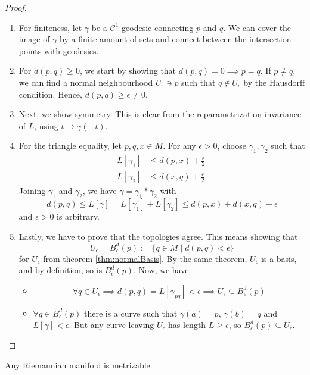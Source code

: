 \begin{proof}
    \begin{enumerate}
        \item For finiteness, let $\gamma$ be a $\mathcal{C}^1$ geodesic connecting $p$ and $q$. We can cover the image of $\gamma$ by a finite amount of sets and connect between the intersection points with geodesics. 
        \item For $d(p,q) \geq 0$, we start by showing that $d(p,q)=0 \implies p=q$. If $p \neq q$, we can find a normal neighbourhood $U_\epsilon \ni p$ such that $q \notin U_\epsilon$ by the Hausdorff condition. Hence, $d(p,q)\geq \epsilon \neq 0$.
        \item Next, we show symmetry. This is clear from the reparametrization invariance of $L$, using $t \mapsto \gamma(-t)$.
        \item For the triangle equality, let $p,q,x \in M$. For any $\epsilon > 0$, choose $\gamma_1,\gamma_2$ such that
        \begin{align*}
            L[\gamma_1] &\leq d(p,x) + \frac{\epsilon}{2}\\
            L[\gamma_2] &\leq d(x,q) + \frac{\epsilon}{2}.
        \end{align*}
        Joining $\gamma_1$ and $\gamma_2$, we have $\gamma = \gamma_1 \ast \gamma_2$ with \[
            d(p,q)\leq L[\gamma] = L[\gamma_1]+L[\gamma_2] \leq d(p,x)+d(x,q)+ \epsilon
        \] and $\epsilon > 0$ is arbitrary.
    \item Lastly, we have to prove that the topologies agree. This means showing that \[
            U_\epsilon = B_\epsilon^d(p):= \{q \in M \mid d(p,q)<\epsilon\}
        \] for $U_\epsilon$ from theorem \ref{thm:normalBasis}. By the same theorem, $U_\epsilon$ is a basis, and by definition, so is $B_\epsilon^d(p)$. Now, we have:
        \begin{itemize}
            \item \[\forall q \in U_\epsilon \implies d(p,q)=L[\gamma_{pq}] < \epsilon \implies U_\epsilon \subseteq B_\epsilon^d(p) \]
        \item $\forall q \in B_\epsilon^d(p)$ there is a curve such that $\gamma(a)=p$, $\gamma(b)=q$ and $L[\gamma]<\epsilon$. But any curve leaving $U_\epsilon$ has length $L \geq \epsilon$, so $B_\epsilon^d(p) \subseteq U_\epsilon$. 
        \end{itemize}
   \end{enumerate} 
\end{proof}
\begin{remark}
    Any Riemannian manifold is metrizable.
\end{remark}
